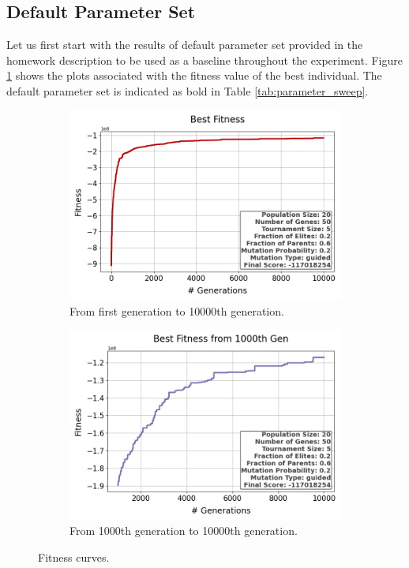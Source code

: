 \documentclass{assignment}
\begin{document}
\subsection{Default Parameter Set}
Let us first start with the results of default parameter set provided in the homework description to be used as a baseline throughout the experiment. Figure \ref{fig:default} shows the plots associated with the fitness value of the best individual. The default parameter set is indicated as bold in Table \ref{tab:parameter_sweep}.


\begin{figure}[H]
    \begin{subfigure}{0.5\textwidth}
        \includegraphics[width=\textwidth]{figures/best_fitness_output_20_50_5_0.2_0.6_0.2_guided.png}
        \caption{From first generation to 10000th generation.}
    \end{subfigure}\hfill
    \begin{subfigure}{0.5\textwidth}
        \includegraphics[width=\textwidth]{figures/best_fitness_1000_output_20_50_5_0.2_0.6_0.2_guided.png}
        \caption{From 1000th generation to 10000th generation.}
    \end{subfigure}
    \caption{Fitness curves.}
    \label{fig:default}
\end{figure}
\end{document}
